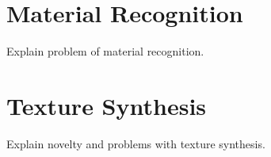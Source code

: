 \hypertarget{MaterialRecognition}{
\section{Material Recognition}
\label{MaterialRecognition}%
}
Explain problem of material recognition.

\hypertarget{TextureSynthesis}{
\section{Texture Synthesis}
\label{ReflectionModels}%
}
Explain novelty and problems with texture synthesis.


